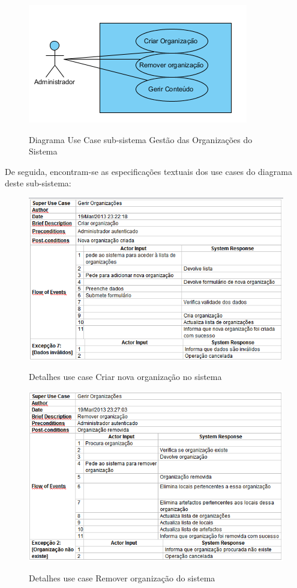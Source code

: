 ﻿\documentclass[12pt,a4paper]{article}
\begin{document}
\begin{figure}[h!]
\centering
\includegraphics[scale=1]{usecase/A_GerirOrganizacoes}
\label{usecase}
\caption{Diagrama Use Case sub-sistema Gestão das Organizações do Sistema}
\end{figure}

De seguida, encontram-se as especificações textuais dos use cases do diagrama deste sub-sistema:\\

\begin{figure}[h!]
\centering
\includegraphics[scale=0.7]{d_usecase/A_criarorganizacao}
\label{usecase}
\caption{Detalhes use case Criar nova organização no sistema}
\end{figure}

\begin{figure}[h!]
\centering
\includegraphics[scale=0.7]{d_usecase/A_removerorganizacao}
\label{usecase}
\caption{Detalhes use case Remover organização do sistema}
\end{figure}
\end{document}
